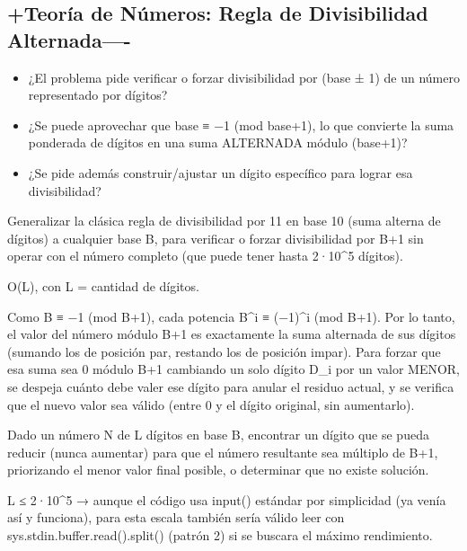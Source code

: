 \subsection{+Teoría de Números: Regla de Divisibilidad Alternada----}


\begin{itemize}
\item ¿El problema pide verificar o forzar divisibilidad por (base ± 1) de un número representado por dígitos?
\item ¿Se puede aprovechar que base ≡ −1 (mod base+1), lo que convierte la suma ponderada de dígitos en una suma ALTERNADA módulo (base+1)?
\item ¿Se pide además construir/ajustar un dígito específico para lograr esa divisibilidad?
\end{itemize}

 Generalizar la clásica regla de divisibilidad por 11 en base 10 (suma alterna de dígitos) a cualquier base B, para verificar o forzar divisibilidad por B+1 sin operar con el número completo (que puede tener hasta 2·10\textasciicircum{}5 dígitos).

 O(L), con L = cantidad de dígitos.

 Como B ≡ −1 (mod B+1), cada potencia B\textasciicircum{}i ≡ (−1)\textasciicircum{}i (mod B+1). Por lo tanto, el valor del número módulo B+1 es exactamente la suma alternada de sus dígitos (sumando los de posición par, restando los de posición impar). Para forzar que esa suma sea 0 módulo B+1 cambiando un solo dígito D\_i por un valor MENOR, se despeja cuánto debe valer ese dígito para anular el residuo actual, y se verifica que el nuevo valor sea válido (entre 0 y el dígito original, sin aumentarlo).


Dado un número N de L dígitos en base B, encontrar un dígito que se pueda reducir (nunca aumentar) para que el número resultante sea múltiplo de B+1, priorizando el menor valor final posible, o determinar que no existe solución.

 L ≤ 2·10\textasciicircum{}5 → aunque el código usa input() estándar por simplicidad (ya venía así y funciona), para esta escala también sería válido leer con sys.stdin.buffer.read().split() (patrón 2) si se buscara el máximo rendimiento.


